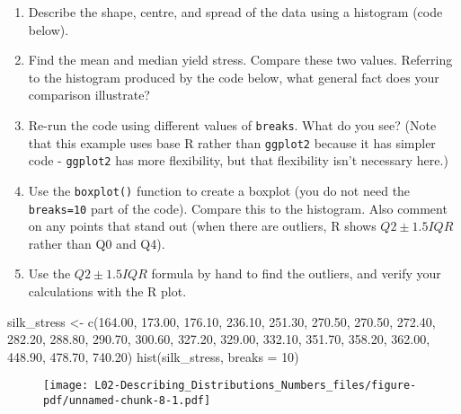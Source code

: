 \documentclass[
  letterpaper,
  DIV=11,
  numbers=noendperiod]{scrreprt}
\newenvironment{Shaded}{\begin{snugshade}}{\end{snugshade}}
\newcommand{\AttributeTok}[1]{\textcolor[rgb]{0.40,0.45,0.13}{#1}}
\newcommand{\DecValTok}[1]{\textcolor[rgb]{0.68,0.00,0.00}{#1}}
\newcommand{\FloatTok}[1]{\textcolor[rgb]{0.68,0.00,0.00}{#1}}
\newcommand{\FunctionTok}[1]{\textcolor[rgb]{0.28,0.35,0.67}{#1}}
\newcommand{\NormalTok}[1]{\textcolor[rgb]{0.00,0.23,0.31}{#1}}
\newcommand{\OtherTok}[1]{\textcolor[rgb]{0.00,0.23,0.31}{#1}}
\providecommand{\tightlist}{%
  \setlength{\itemsep}{0pt}\setlength{\parskip}{0pt}}\usepackage{longtable,booktabs,array}
\begin{document}
\begin{enumerate}
\def\labelenumi{\alph{enumi}.}
\tightlist
\item
  Describe the shape, centre, and spread of the data using a histogram
  (code below).
\item
  Find the mean and median yield stress. Compare these two values.
  Referring to the histogram produced by the code below, what general
  fact does your comparison illustrate?
\item
  Re-run the code using different values of \texttt{breaks}. What do you
  see? (Note that this example uses base R rather than \texttt{ggplot2}
  because it has simpler code - \texttt{ggplot2} has more flexibility,
  but that flexibility isn't necessary here.)
\item
  Use the \texttt{boxplot()} function to create a boxplot (you do not
  need the \texttt{breaks=10} part of the code). Compare this to the
  histogram. Also comment on any points that stand out (when there are
  outliers, R shows \(Q2\pm 1.5IQR\) rather than Q0 and Q4).
\item
  Use the \(Q2\pm 1.5IQR\) formula by hand to find the outliers, and
  verify your calculations with the R plot.
\end{enumerate}

\begin{Shaded}
\begin{Highlighting}[]
\NormalTok{silk\_stress }\OtherTok{\textless{}{-}} \FunctionTok{c}\NormalTok{(}\FloatTok{164.00}\NormalTok{, }\FloatTok{173.00}\NormalTok{, }\FloatTok{176.10}\NormalTok{, }\FloatTok{236.10}\NormalTok{, }\FloatTok{251.30}\NormalTok{, }\FloatTok{270.50}\NormalTok{, }\FloatTok{270.50}\NormalTok{,}
    \FloatTok{272.40}\NormalTok{, }\FloatTok{282.20}\NormalTok{, }\FloatTok{288.80}\NormalTok{, }\FloatTok{290.70}\NormalTok{, }\FloatTok{300.60}\NormalTok{, }\FloatTok{327.20}\NormalTok{, }\FloatTok{329.00}\NormalTok{,}
    \FloatTok{332.10}\NormalTok{, }\FloatTok{351.70}\NormalTok{, }\FloatTok{358.20}\NormalTok{, }\FloatTok{362.00}\NormalTok{, }\FloatTok{448.90}\NormalTok{, }\FloatTok{478.70}\NormalTok{, }\FloatTok{740.20}\NormalTok{)}
\FunctionTok{hist}\NormalTok{(silk\_stress, }\AttributeTok{breaks =} \DecValTok{10}\NormalTok{)}
\end{Highlighting}
\end{Shaded}

\begin{figure}[H]

{\centering \texttt{[image: L02-Describing\_Distributions\_Numbers\_files/figure-pdf/unnamed-chunk-8-1.pdf]}

}

\end{figure}
\end{document}
